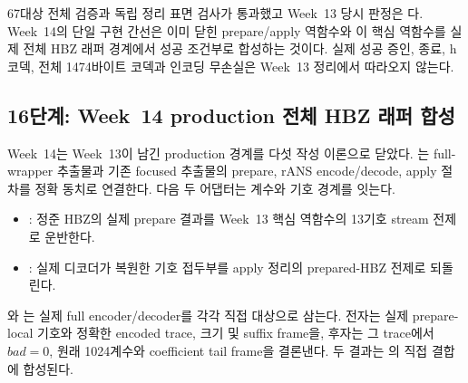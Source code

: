 67대상  전체 검증과 독립 정리 표면 검사가 통과했고
Week~13 당시 판정은 다. Week~14의 단일 구현 간선은 이미 닫힌
prepare/apply 역함수와 이 핵심 역함수를 실제 전체 HBZ 래퍼 경계에서
성공 조건부로 합성하는 것이다. 실제 성공 증인, 종료, h 코덱, 전체 1474바이트
코덱과 인코딩 무손실은 Week~13 정리에서 따라오지 않는다.

\subsection{16단계: Week~14 production 전체 HBZ 래퍼 합성}

Week~14는 Week~13이 남긴 production 경계를 다섯 작성 이론으로 닫았다.
\allowbreak{}는
full-wrapper 추출물과 기존 focused
추출물의 prepare, rANS encode/decode, apply 절차를 정확 동치로 연결한다. 다음
두 어댑터는 계수와 기호 경계를 잇는다.

\begin{itemize}
  \item {}: 정준 HBZ의 실제
        prepare 결과를 Week~13 핵심 역함수의 13기호 stream 전제로 운반한다.
  \item {}: 실제 디코더가 복원한
        기호 접두부를 apply 정리의 prepared-HBZ 전제로 되돌린다.
\end{itemize}

와
는 실제 full encoder/decoder를 각각
직접 대상으로 삼는다. 전자는 실제 prepare-local 기호와 정확한 encoded trace,
크기 및 suffix frame을, 후자는 그 trace에서 \(bad=0\), 원래 1024계수와
coefficient tail frame을 결론낸다. 두 결과는
의 직접 결합에 합성된다.

